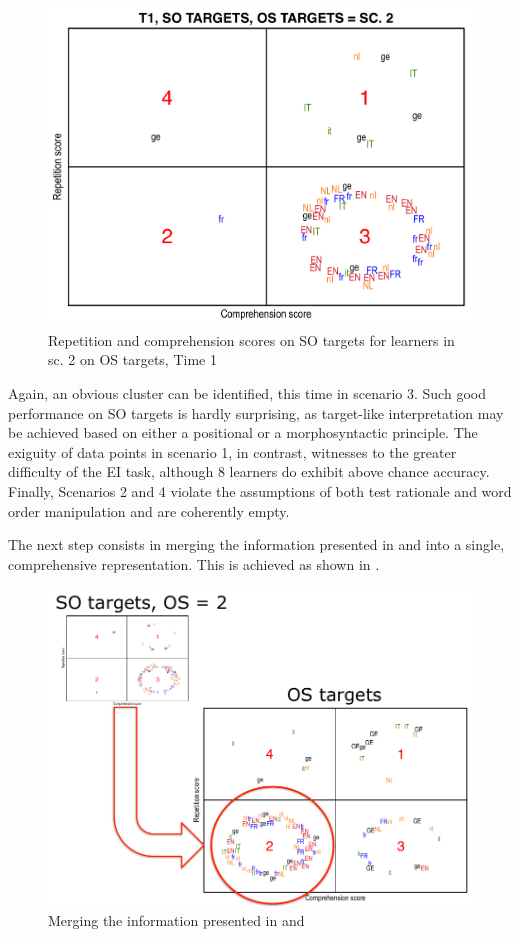 \begin{figure}
    \includegraphics[width=\textwidth]{figures/06-3.pdf}
    \caption{Repetition and comprehension scores on SO targets for learners in sc. 2 on OS targets, Time 1}
    \label{fig:06:3}
\end{figure}

Again, an obvious cluster can be identified, this time in scenario 3. Such good performance on SO targets is hardly surprising, as target-like interpretation may be achieved based on either a positional or a morphosyntactic principle. The exiguity of data points in scenario 1, in contrast, witnesses to the greater difficulty of the EI task, although 8 learners do exhibit above chance accuracy. Finally, Scenarios 2 and 4 violate the assumptions of both test rationale and word order manipulation and are coherently empty.

The next step consists in merging the information presented in  and  into a single, comprehensive representation. This is achieved as shown in .

\begin{figure}
    \includegraphics[width=\textwidth]{figures/06-4.pdf}
    \caption{Merging the information presented in  and }
    \label{fig:06:4}
\end{figure}

